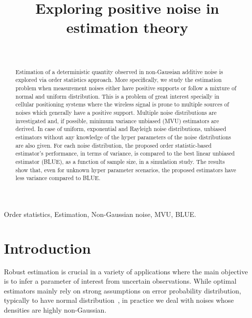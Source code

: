\documentclass[journal]{IEEEtran}
\title{Exploring positive noise in estimation theory}
\author
{
	\IEEEauthorblockN{Kamiar Radnosrati, Gustaf Hendeby, Fredrik Gustafsson}\\
	\IEEEauthorblockA{Department of Electrical Engineering, Link\"oping University, Link\"oping, Sweden\\
		Email: \{kamiar.radnosrati, gustaf.hendeby, fredrik.gustafsson\}@liu.se}
}
\begin{document}
\maketitle

\begin{abstract}
Estimation of a deterministic quantity observed in non-Gaussian additive noise is explored via order statistics approach.  More specifically, we study the estimation problem when measurement noises either have positive supports or follow a mixture of normal and uniform distribution. This is a problem of great interest specially in cellular positioning systems where the wireless signal is prone to multiple sources of noises which generally have a positive support. Multiple noise distributions are investigated and, if possible, minimum variance unbiased (MVU) estimators are derived. In case of uniform, exponential and Rayleigh noise distributions, unbiased estimators without any knowledge of the hyper parameters of the noise distributions are also given. For each noise distribution, the proposed order statistic-based estimator's performance, in terms of  variance, is compared to the best linear unbiased estimator (BLUE), as a function of sample size, in a simulation study. The results show that, even for unknown hyper parameter scenarios, the proposed estimators have less variance compared to BLUE. 
\end{abstract}
\begin{IEEEkeywords}
	Order statistics, Estimation, Non-Gaussian noise, MVU, BLUE.
\end{IEEEkeywords}


\section{Introduction}\label{sec:introduction}
Robust estimation is crucial in a variety of applications where the main objective is to infer a parameter of interest from uncertain observations. While optimal estimators mainly rely on strong assumptions on error probability distribution, typically to have normal distribution~\cite{article:ISPM_kim_08}, in practice we deal with noises whose densities are highly non-Gaussian.
\end{document}
